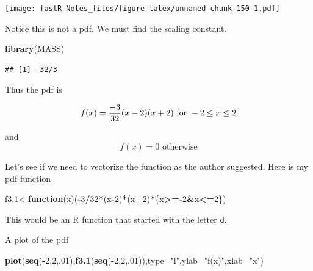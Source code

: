 \documentclass[]{book}
\newenvironment{Shaded}{\begin{snugshade}}{\end{snugshade}}
\newcommand{\KeywordTok}[1]{\textcolor[rgb]{0.13,0.29,0.53}{\textbf{#1}}}
\newcommand{\DataTypeTok}[1]{\textcolor[rgb]{0.13,0.29,0.53}{#1}}
\newcommand{\DecValTok}[1]{\textcolor[rgb]{0.00,0.00,0.81}{#1}}
\newcommand{\StringTok}[1]{\textcolor[rgb]{0.31,0.60,0.02}{#1}}
\newcommand{\OtherTok}[1]{\textcolor[rgb]{0.56,0.35,0.01}{#1}}
\newcommand{\ControlFlowTok}[1]{\textcolor[rgb]{0.13,0.29,0.53}{\textbf{#1}}}
\newcommand{\OperatorTok}[1]{\textcolor[rgb]{0.81,0.36,0.00}{\textbf{#1}}}
\newcommand{\NormalTok}[1]{#1}
\theoremstyle{definition}
\theoremstyle{definition}
\theoremstyle{definition}
\theoremstyle{remark}
\begin{document}
\texttt{[image: fastR-Notes\_files/figure-latex/unnamed-chunk-150-1.pdf]}

Notice this is not a pdf. We must find the scaling constant.

\begin{Shaded}
\begin{Highlighting}[]
\KeywordTok{library}\NormalTok{(MASS)}
\end{Highlighting}
\end{Shaded}

\begin{Shaded}
\end{Shaded}

\begin{verbatim}
## [1] -32/3
\end{verbatim}

Thus the pdf is

\[f(x)={-3 \over 32}(x-2)(x+2) \mbox{ for } -2 \leq x \leq 2\]

and \[f(x)=0 \mbox{ otherwise}\]

Let's see if we need to vectorize the function as the author suggested.
Here is my pdf function

\begin{Shaded}
\begin{Highlighting}[]
\NormalTok{f3.}\DecValTok{1}\NormalTok{<-}\ControlFlowTok{function}\NormalTok{(x)(}\OperatorTok{-}\DecValTok{3}\OperatorTok{/}\DecValTok{32}\OperatorTok{*}\NormalTok{(x}\OperatorTok{-}\DecValTok{2}\NormalTok{)}\OperatorTok{*}\NormalTok{(x}\OperatorTok{+}\DecValTok{2}\NormalTok{)}\OperatorTok{*}\NormalTok{\{x}\OperatorTok{>=-}\DecValTok{2}\OperatorTok{&}\NormalTok{x}\OperatorTok{<=}\DecValTok{2}\NormalTok{\})}
\end{Highlighting}
\end{Shaded}

This would be an R function that started with the letter \texttt{d}.

A plot of the pdf

\begin{Shaded}
\begin{Highlighting}[]
\KeywordTok{plot}\NormalTok{(}\KeywordTok{seq}\NormalTok{(}\OperatorTok{-}\DecValTok{2}\NormalTok{,}\DecValTok{2}\NormalTok{,.}\DecValTok{01}\NormalTok{),}\KeywordTok{f3.1}\NormalTok{(}\KeywordTok{seq}\NormalTok{(}\OperatorTok{-}\DecValTok{2}\NormalTok{,}\DecValTok{2}\NormalTok{,.}\DecValTok{01}\NormalTok{)),}\DataTypeTok{type=}\StringTok{"l"}\NormalTok{,}\DataTypeTok{ylab=}\StringTok{"f(x)"}\NormalTok{,}\DataTypeTok{xlab=}\StringTok{"x"}\NormalTok{)}
\end{Highlighting}
\end{Shaded}
\end{document}
